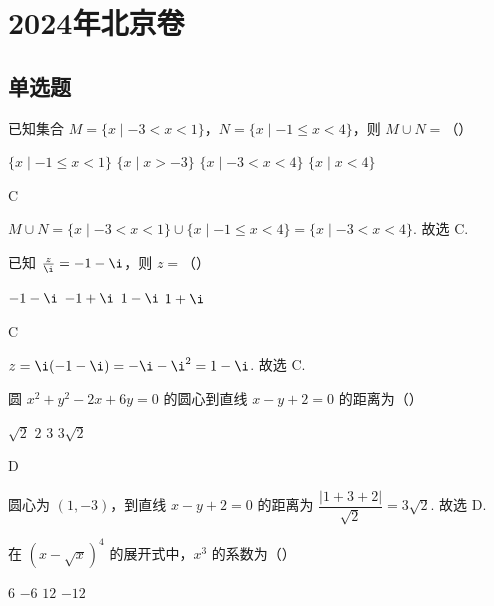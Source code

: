 \chapter{2024年北京卷}

\section{单选题}

\begin{problem}
已知集合 \(M=\{x\mid -3<x<1\}\)，\(N=\{x\mid -1\le x<4\}\)，则 \(M\cup N=\)（\quad）

\choices
    {\(\{x\mid -1\le x<1\}\)}
    {\(\{x\mid x>-3\}\)}
    {\(\{x\mid -3<x<4\}\)}
    {\(\{x\mid x<4\}\)}
\end{problem}

\begin{answer}
C
\end{answer}

\begin{solution}
\(M\cup N=\{x\mid-3<x<1\}\cup\{x\mid-1\le x<4\}=\{x\mid-3<x<4\}\). 故选 C.
\end{solution}

\begin{problem}
已知 \(\frac{z}{\i}=-1-\i\)，则 \(z=\)（\quad）

\choices
    {\(-1-\i\)}
    {\(-1+\i\)}
    {\(1-\i\)}
    {\(1+\i\)}
\end{problem}

\begin{answer}
C
\end{answer}

\begin{solution}
\(z=\i(-1-\i)=-\i-\i^2=1-\i\). 故选 C.
\end{solution}

\begin{problem}
圆 \(x^2+y^2-2x+6y=0\) 的圆心到直线 \(x-y+2=0\) 的距离为（\quad）

\choices
    {\(\sqrt{2}\)}
    {\(2\)}
    {\(3\)}
    {\(3\sqrt{2}\)}
\end{problem}

\begin{answer}
D
\end{answer}

\begin{solution}
圆心为 \((1,-3)\)，到直线 \(x-y+2=0\) 的距离为 \(\dfrac{|1+3+2|}{\sqrt2}=3\sqrt2\). 故选 D.
\end{solution}

\begin{problem}
在 \(\left( x-\sqrt{x} \right)^4\) 的展开式中，\(x^3\) 的系数为（\quad）

\choices
    {\(6\)}
    {\(-6\)}
    {\(12\)}
    {\(-12\)}
\end{problem}

